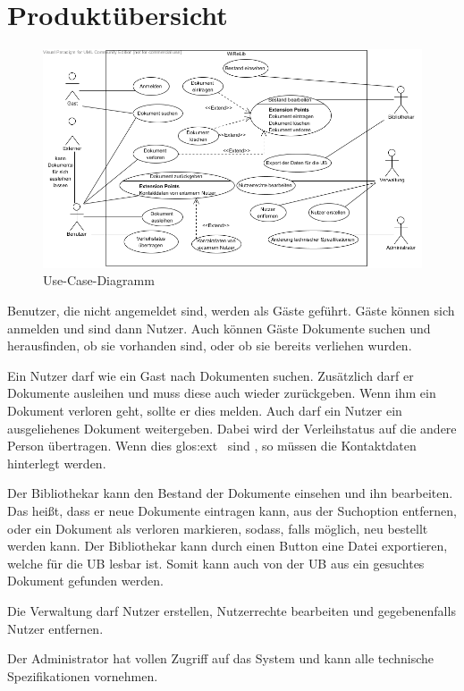 \chapter{Produktübersicht}

\begin{figure}[h]
\centering
\label{use-case}
\includegraphics[width=0.8\linewidth]{bilder/use-case.png}
\caption[Use-Case-Diagramm]{Use-Case-Diagramm}
\end{figure}


Benutzer, die nicht angemeldet sind, werden als Gäste geführt.
Gäste können sich anmelden und sind dann Nutzer.
Auch können Gäste Dokumente suchen und herausfinden, ob sie vorhanden sind, oder ob sie bereits verliehen wurden.

Ein Nutzer darf wie ein Gast nach Dokumenten suchen.
Zusätzlich darf er Dokumente ausleihen und muss diese auch wieder zurückgeben.
Wenn ihm ein Dokument verloren geht, sollte er dies melden.
Auch darf ein Nutzer ein ausgeliehenes Dokument weitergeben.
Dabei wird der Verleihstatus auf die andere Person übertragen.
Wenn dies \gls{glos:ext} \ sind , so müssen die Kontaktdaten hinterlegt werden.

Der Bibliothekar kann den Bestand der Dokumente einsehen und ihn bearbeiten.
Das heißt, dass er neue Dokumente eintragen kann, aus der Suchoption entfernen, oder ein Dokument als verloren markieren, sodass, falls möglich, neu bestellt werden kann.
Der Bibliothekar kann durch einen Button eine Datei exportieren, welche für die \gls{UB} lesbar ist.
Somit kann auch von der \gls{UB} aus ein gesuchtes Dokument gefunden werden.

Die Verwaltung darf Nutzer erstellen, Nutzerrechte bearbeiten und gegebenenfalls Nutzer entfernen.

Der Administrator hat vollen Zugriff auf das System und kann alle technische Spezifikationen vornehmen.